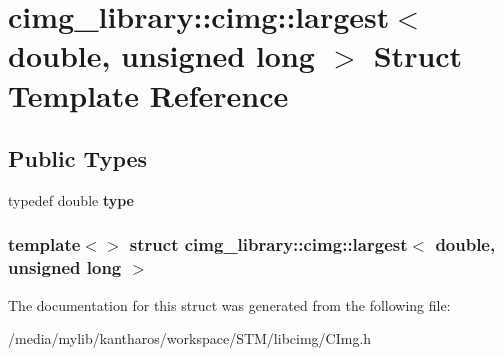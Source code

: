\hypertarget{structcimg__library_1_1cimg_1_1largest_3_01double_00_01unsigned_01long_01_4}{
\section{cimg\_\-library::cimg::largest$<$ double, unsigned long $>$ Struct Template Reference}
\label{structcimg__library_1_1cimg_1_1largest_3_01double_00_01unsigned_01long_01_4}
}
\subsection*{Public Types}
\begin{DoxyCompactItemize}
\item 
\hypertarget{structcimg__library_1_1cimg_1_1largest_3_01double_00_01unsigned_01long_01_4_a3a646724db7b00b6d7aa256bd726b85f}{
typedef double {\bfseries type}}
\label{structcimg__library_1_1cimg_1_1largest_3_01double_00_01unsigned_01long_01_4_a3a646724db7b00b6d7aa256bd726b85f}

\end{DoxyCompactItemize}
\subsubsection*{template$<$$>$ struct cimg\_\-library::cimg::largest$<$ double, unsigned long $>$}



The documentation for this struct was generated from the following file:\begin{DoxyCompactItemize}
\item 
/media/mylib/kantharos/workspace/STM/libcimg/CImg.h\end{DoxyCompactItemize}
